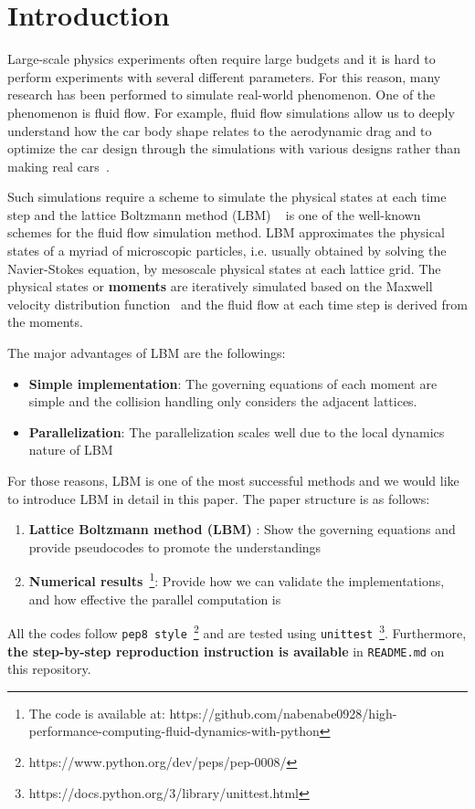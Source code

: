 \chapter{Introduction}
\vspace{-8mm}
Large-scale physics experiments often require large budgets
and it is hard to perform experiments with several different parameters.
For this reason, many research has been performed to simulate real-world 
phenomenon.
One of the phenomenon is fluid flow.
For example, fluid flow simulations allow us to deeply understand
how the car body shape relates to the aerodynamic drag
and to optimize the car design through the simulations with
various designs rather than making real cars~\cite{padagannavar2016automotive}.

Such simulations require a scheme to simulate the physical states
at each time step
and the lattice Boltzmann method (LBM) ~\cite{timm2016lattice}
is one of the well-known
schemes for the fluid flow simulation method.
LBM approximates the physical states of a myriad of microscopic particles,
i.e. usually obtained by solving the Navier-Stokes equation,
by mesoscale physical states at each lattice grid.
The physical states or {\bf moments} are iteratively simulated based on
the Maxwell velocity distribution function~\cite{huang1963statistical} and
the fluid flow at each time step is derived from the moments.

The major advantages of LBM are the followings:
\begin{itemize}
  \item {\bf Simple implementation}: The governing equations of each moment
  are simple and the collision handling only considers the adjacent lattices. 
  \item {\bf Parallelization}: The parallelization scales well due to
  the local dynamics nature of LBM~\cite{raabe2004overview}
\end{itemize}
For those reasons, LBM is one of the most successful methods and
we would like to introduce LBM in detail in this paper.
The paper structure is as follows:
\begin{enumerate}
  \item {\bf Lattice Boltzmann method (LBM) }: Show the governing equations and 
  provide pseudocodes to promote the understandings
  \item {\bf Numerical results}~\footnote{
  The code is available at:
    https://github.com/nabenabe0928/high-performance-computing-fluid-dynamics-with-python
  }: Provide how we can validate the implementations,
  and how effective the parallel computation is
\end{enumerate}
All the codes follow {\tt pep8 style}~\footnote{https://www.python.org/dev/peps/pep-0008/} and 
are tested using
{\tt unittest}~\footnote{https://docs.python.org/3/library/unittest.html}.
Furthermore, {\bf the step-by-step reproduction instruction is available}
in {\tt README.md} on this repository.
